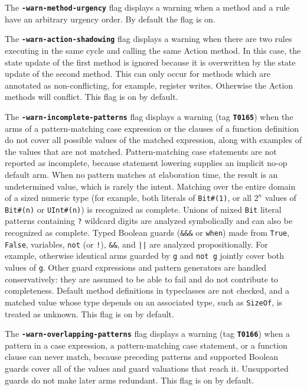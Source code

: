 \documentclass{article}
\newcommand{\te}[1]{\texttt{#1}}
\begin{document}
The {\bf\tt -warn-method-urgency} flag displays a warning when a
method and a rule have an arbitrary urgency order.  By default the
flag is on.

The {\bf\tt -warn-action-shadowing} flag displays a warning when there
are two rules  executing in the same cycle and calling the same Action
method.  In this case,  the state update of the first method is ignored because it is
overwritten by the state update of the second method.  This can only
occur for methods  which are annotated as non-conflicting, for
example,  register writes.  Otherwise the Action methods will
conflict. This flag is on by default.

The {\bf\tt -warn-incomplete-patterns} flag displays a warning (tag
{\bf\tt T0165}) when the arms of a pattern-matching case expression or
the clauses of a function definition do not cover all possible values
of the matched expression, along with examples of the values that are
not matched.  Pattern-matching case statements are not reported as
incomplete, because statement lowering supplies an implicit no-op
default arm.  When no pattern matches at
elaboration time, the result is an undetermined value, which is
rarely the intent.  Matching over the entire domain of a sized
numeric type (for example, both literals of \te{Bit\#(1)}, or all
$2^n$ values of \te{Bit\#(n)} or \te{UInt\#(n)}) is
recognized as complete.  Unions of mixed \te{Bit} literal patterns
containing \te{?} wildcard digits are analyzed symbolically and can
also be recognized as complete.  Typed Boolean guards (\te{\&\&\&}
or \te{when}) made from \te{True}, \te{False}, variables, \te{not}
(or \te{!}), \te{\&\&}, and \te{||} are analyzed propositionally.
For example, otherwise identical arms guarded by \te{g} and
\te{not g} jointly cover both values of \te{g}.  Other guard
expressions and pattern generators are handled conservatively: they
are assumed to be able to fail and do not contribute to completeness.
Default method definitions in typeclasses are not checked, and a
matched value whose type depends on an associated type, such as
\te{SizeOf}, is treated as unknown.  This flag is on by default.

The {\bf\tt -warn-overlapping-patterns} flag displays a warning (tag
{\bf\tt T0166}) when a pattern in a case expression, a
pattern-matching case statement, or a function clause can never
match, because preceding patterns and supported Boolean guards cover
all of the values and guard valuations that reach it.  Unsupported
guards do not make later arms redundant.  This flag is on by default.
\end{document}
